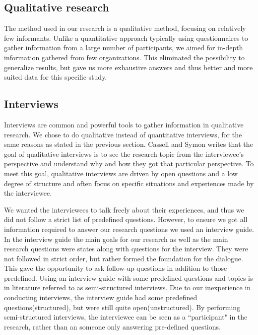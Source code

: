 \subsection{Qualitative research}
The method used in our research is a qualitative method, focusing on relatively few informants. Unlike a quantitative approach typically using questionnaires to gather information from a large number of participants, we aimed for in-depth information gathered from few organizations. This eliminated the possibility to generalize results, but gave us more exhaustive answers and thus better and more suited data for this specific study.

\subsection{Interviews}
Interviews are common and powerful tools to gather information in qualitative research\cite{myers2007qualitative}. We chose to do qualitative instead of quantitative interviews, for the same reasons as stated in the previous section. Cassell and Symon writes \cite{cassell2004essential} that the goal of qualitative interviews is to see the research topic from the interviewee's perspective and understand why and how they got that particular perspective. To meet this goal, qualitative interviews are driven by open questions and a low degree of structure and often focus on specific situations and experiences made by the interviewee.

We wanted the interviewees to talk freely about their experiences, and thus we did not follow a strict list of predefined questions. However, to ensure we got all information required to answer our research questions we used an interview guide. In the interview guide the main goals for our research as well as the main research questions were states along with questions for the interview. They were not followed in strict order, but rather formed the foundation for the dialogue. This gave the opportunity to ask follow-up questions in addition to those predefined. Using an interview guide with some predefined questions and topics is in literature referred to as semi-structured interviews\cite{cassell2004essential}. Due to our inexperience in conducting interviews, the interview guide had some predefined questions(structured), but were still quite open(unstructured). By performing semi-structured interviews, the interviewee can be seen as a ``participant" in the research, rather than an someone only answering pre-defined questions.

